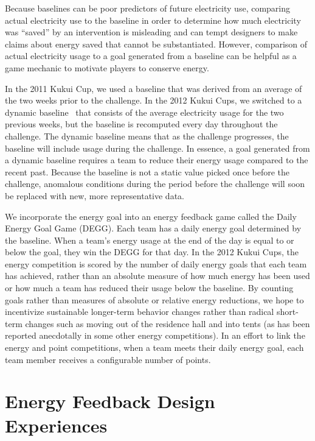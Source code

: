 \documentclass[10pt, conference, compsocconf]{IEEEtran-old}
\begin{document}
Because baselines can be poor predictors of future electricity use, comparing actual electricity use to the baseline in order to determine how much electricity was ``saved'' by an intervention is misleading and can tempt designers to make claims about energy saved that cannot be substantiated. However, comparison of actual electricity usage to a goal generated from a baseline can be helpful as a game mechanic to motivate players to conserve energy.

In the 2011 Kukui Cup, we used a baseline that was derived from an average of the two weeks prior to the challenge. In the 2012 Kukui Cups, we switched to a dynamic baseline~\cite{csdl2-12-08} that consists of the average electricity usage for the two previous weeks, but the baseline is recomputed every day throughout the challenge. The dynamic baseline means that as the challenge progresses, the baseline will include usage during the challenge. In essence, a goal generated from a dynamic baseline requires a team to reduce their energy usage compared to the recent past. Because the baseline is not a static value picked once before the challenge, anomalous conditions during the period before the challenge will soon be replaced with new, more representative data.

We incorporate the energy goal into an energy feedback game called the Daily Energy Goal Game (DEGG). Each team has a daily energy goal determined by the baseline. When a team's energy usage at the end of the day is equal to or below the goal, they win the DEGG for that day. In the 2012 Kukui Cups, the energy competition is scored by the number of daily energy goals that each team has achieved, rather than an absolute measure of how much energy has been used or how much a team has reduced their usage below the baseline. By counting goals rather than measures of absolute or relative energy reductions, we hope to incentivize sustainable longer-term behavior changes rather than radical short-term changes such as moving out of the residence hall and into tents (as has been reported anecdotally in some other energy competitions). In an effort to link the energy and point competitions, when a team meets their daily energy goal, each team member receives a configurable number of points.


\section{Energy Feedback Design Experiences}
\end{document}
